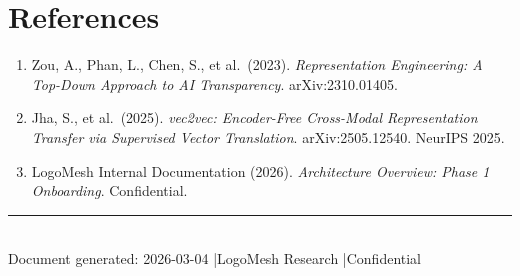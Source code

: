 \documentclass[11pt, a4paper]{article}
\begin{document}
\clearpage
\section*{References}

\begin{enumerate}[leftmargin=2em]
  \item Zou, A., Phan, L., Chen, S., et al.\ (2023).
        \textit{Representation Engineering: A Top-Down Approach to AI Transparency}.
        arXiv:2310.01405.

  \item Jha, S., et al.\ (2025).
        \textit{vec2vec: Encoder-Free Cross-Modal Representation Transfer via Supervised Vector Translation}.
        arXiv:2505.12540. NeurIPS 2025.

  \item LogoMesh Internal Documentation (2026).
        \textit{Architecture Overview: Phase 1 Onboarding}.
        Confidential.
\end{enumerate}

\vfill
\begin{center}
  \small\color{darkgray}
  \rule{8cm}{0.4pt}\\[4pt]
  Document generated: 2026-03-04 \quad|\quad LogoMesh Research \quad|\quad Confidential
\end{center}
\end{document}
